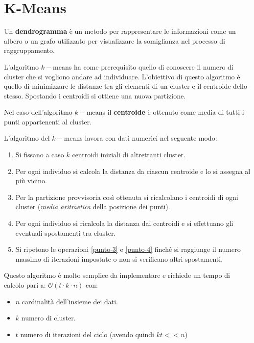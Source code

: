 \section{K-Means}
\begin{definizione}
      Un \textbf{dendrogramma} è un metodo per rappresentare le informazioni come
      un albero o un grafo utilizzato per visualizzare la somiglianza nel processo
      di raggruppamento.
\end{definizione}
L'algoritmo $k-$means ha come prerequisito quello di conoscere il numero di
cluster che si vogliono andare ad individuare. L'obiettivo di questo algoritmo è
quello di minimizzare le distanze tra gli elementi di un cluster e il centroide
dello stesso. Spostando i centroidi si ottiene una nuova partizione.
\begin{definizione}
      Nel caso dell'algoritmo $k-$means il \textbf{centroide} è ottenuto come
      media di tutti i punti appartenenti al cluster.
\end{definizione}
L'algoritmo del $k-$means lavora con dati numerici nel seguente modo:
\begin{enumerate}
      \item Si fissano a caso $k$ centroidi iniziali di altrettanti cluster.
      \item Per ogni individuo si calcola la distanza da ciascun centroide e lo
            si assegna al più vicino.
      \item \label{punto-3} Per la partizione provvisoria così ottenuta si
            ricalcolano i centroidi di ogni cluster (\textit{media aritmetica}
            della posizione dei punti).
      \item \label{punto-4} Per ogni individuo si ricalcola la distanza dai
            centroidi e si effettuano gli eventuali spostamenti tra cluster.
      \item Si ripetono le operazioni \ref{punto-3} e \ref{punto-4} finché si
            raggiunge il numero massimo di iterazioni impostate o non si
            verificano altri spostamenti.
\end{enumerate}
Questo algoritmo è molto semplice da implementare e richiede un tempo di calcolo
pari a: $\mathcal{O}(t \cdot k \cdot n)$ con:
\begin{itemize}
      \item $n$ cardinalità dell'insieme dei dati.
      \item $k$ numero di cluster.
      \item $t$ numero di iterazioni del ciclo (avendo quindi $kt << n$)
\end{itemize}
